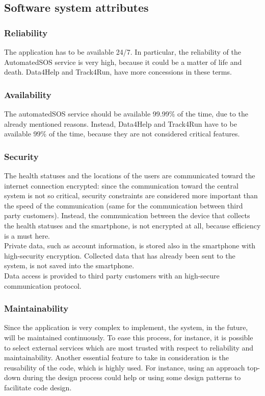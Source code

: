 \subsection{Software system attributes}
\subsubsection{Reliability}
The application has to be available 24/7. In particular, the reliability of the AutomatedSOS service is very high, because it could be a matter of life and death. Data4Help and Track4Run, have more concessions in these terms.

\subsubsection{Availability}
The automatedSOS service should be available 99.99\% of the time, due to the already mentioned reasons. Instead, Data4Help and Track4Run have to be available 99\% of the time, because they are not considered critical features.  

\subsubsection{Security}
The health statuses and the locations of the users are communicated toward the internet connection encrypted: since the communication toward the central system is not so critical, security constraints are considered more important than the speed of the communication (same for the communication between third party customers). Instead, the communication between the device that collects the health statuses and the smartphone, is not encrypted at all, because efficiency is a must here. \\ 
Private data, such as account information, is stored also in the smartphone with high-security encryption. Collected data that has already been sent to the system, is not saved into the smartphone. \\
Data access is provided to third party customers with an high-secure communication protocol.

\subsubsection{Maintainability}
Since the application is very complex to implement, the system, in the future, will be maintained continuously. To ease this process, for instance, it is possible to select external services which are most trusted with respect to reliability and maintainability. Another essential feature to take in consideration is the reusability of the code, which is highly used. For instance, using an approach top-down during the design process could help or using some design patterns to facilitate code design.

